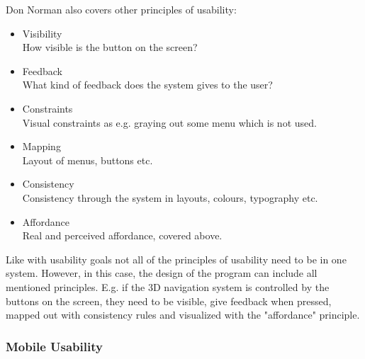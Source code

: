 Don Norman also covers other principles of usability:\cite{Normans}
\begin{itemize}
\item Visibility\\
How visible is the button on the screen?
\item Feedback\\
What kind of feedback does the system gives to the user?
\item Constraints\\
Visual constraints as e.g. graying out some menu which is not used.
\item Mapping \\
Layout of menus, buttons etc.
\item Consistency\\
Consistency through the system in layouts, colours, typography etc.
\item Affordance\\
Real and perceived affordance, covered above.
\end{itemize}

Like with usability goals not all of the principles of usability need to be in 
one system. However, in this case, the design of the program can include all 
mentioned principles. E.g. if the 3D navigation system is controlled by the 
buttons on the screen, they need to be visible, give feedback when 
pressed, mapped out with consistency rules and visualized with the "affordance" 
principle. 

\subsubsection{Mobile Usability}
\label{MobileUsability}

